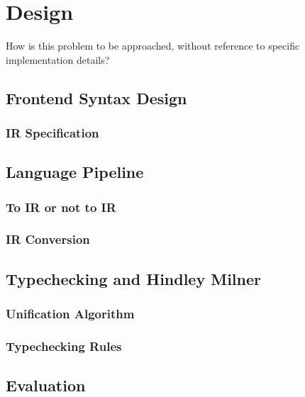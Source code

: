 \documentclass{l4proj}
\begin{document}
\chapter{Design}
How is this problem to be approached, without reference to specific implementation details? 
\section{Frontend Syntax Design}
\subsection{IR Specification}
\section{Language Pipeline}
\subsection{To IR or not to IR}
\subsection{IR Conversion}
\section{Typechecking and Hindley Milner}
\subsection{Unification Algorithm}
\subsection{Typechecking Rules}
\section{Evaluation}

\end{document}
